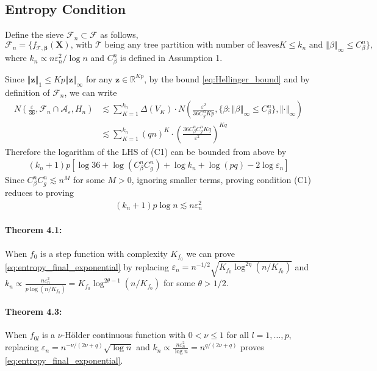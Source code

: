 \documentclass[12pt]{article}
\newcommand{\bm}[1]{\boldsymbol{#1}}
\newcommand{\mT}{\mathcal{T}}
\newcommand{\norm}[1]{\left\Vert#1\right\Vert}
\newcommand{\1}{\mathbb{I}}
\def\mF{\mathcal{F}}
\def\b{\bm{\beta}}
\def\X{\bm{X}}
\def\b{\bm{\beta}}
\def\b{\mbox{\boldmath$b$}}
\def\X{\mbox{\boldmath$X$}}
\def\b{\bm{\beta}}
\def\X{\bm{X}}
\def\b{\bm{\beta}}
\theoremstyle{plain}
\theoremstyle{definition}
\theoremstyle{remark}
\begin{document}
\subsection{Entropy Condition}\label{sub:entropy_proof}
Define the sieve $\mF_n \subset \mF$ as follows,
\begin{equation*}
    \mF_n = \{f_{\mT,{\b}}(\X) \text{, with $\mT$ being any tree partition with number of leaves} K \le k_n \text{ and } \norm{\beta}_\infty \le C^n_\beta\},
\end{equation*}
where $k_n \propto n \varepsilon_n^2 / \log n$ and $C^n_\beta$ is defined in Assumption 1.

Since $\norm{\bm{z}}_1 \le Kp\norm{\bm{z}}_\infty$ for any $\bm{z} \in \mathbb{R}^{Kp}$, by the bound \eqref{eq:Hellinger_bound} and by definition of $\mF_n$, we can write
\begin{align*}
 N \left(\frac{\varepsilon}{36}, \mF_n \cap \mathcal{A}_\varepsilon, H_n\right)
 & \lesssim \sum_{K=1}^{k_n} \Delta(V_K) \cdot N \left(\frac{\varepsilon^2}{36C^n_g Kp},
 \{\beta: \norm{\beta}_\infty \le C^n_\beta\}, \norm{\cdot}_\infty \right) \\
 & \lesssim \sum_{K=1}^{k_n} (qn)^K \cdot 
 \left (\frac{36 C_\beta^n C_g^n Kq}{\varepsilon^2} \right )^{Kq}
\end{align*}
Therefore the logarithm of the LHS of (C1) can be bounded from above by
\begin{align*}
 (k_n+1)p \left [\log 36 + \log (C_\beta^n C_g^n) + \log k_n + \log (pq) - 2\log \varepsilon_n \right ]
\end{align*}
Since $C_\beta^n C_g^n \lesssim n^M$ for some $M>0$, ignoring smaller terms, proving condition (C1) reduces to proving
\begin{align}\label{eq:entropy_final_exponential}
 (k_n+1)p \log n \lesssim n\varepsilon_n^2
\end{align}

\paragraph{Theorem 4.1:} When $f_0$ is a step function with complexity $K_{f_0}$ we can prove \eqref{eq:entropy_final_exponential} by replacing $\varepsilon_n= n^{-1/2}\sqrt{K_{f_0}\log^{2\eta}(n/ K_{f_0})}$ and $k_n \propto \frac{n\varepsilon_n^2}{p \log (n/  K_{f_0})}= K_{f_0}\log^{2\theta-1}(n/K_{f_0})$ for some $\theta > 1/2$.

\paragraph{Theorem 4.3:} When $f_{0l}$ is a $\nu$-H\"{o}lder continuous function with $0 < \nu \le 1$ for all $l=1,\dots,p$, replacing $\varepsilon_n= n^{-\nu/(2\nu+q)}\sqrt{\log n}$ and $k_n \propto \frac{n\varepsilon_n^2}{\log n}= n^{q/(2\nu+q)}$ proves \eqref{eq:entropy_final_exponential}.
\end{document}
